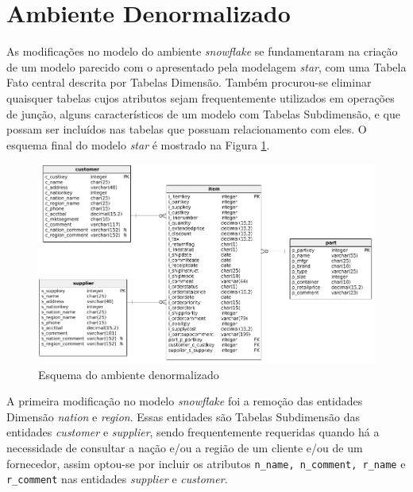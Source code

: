 \section{Ambiente Denormalizado}

As modificações no modelo do ambiente \textit{snowflake} se fundamentaram na criação de um modelo parecido com o apresentado pela modelagem \textit{star}, com uma Tabela Fato central descrita por Tabelas Dimensão. Também procurou-se eliminar quaisquer tabelas cujos atributos sejam frequentemente utilizados em operações de junção, alguns característicos de um modelo com Tabelas Subdimensão, e que possam ser incluídos nas tabelas que possuam relacionamento com eles. O esquema final do modelo \textit{star} é mostrado na Figura \ref{fig:star}.

\begin{figure}[h]
	\centering
		\includegraphics[width=\textwidth]{img/star.png}
	\caption{Esquema do ambiente denormalizado}
	\label{fig:star}
\end{figure}
 
A primeira modificação no modelo \textit{snowflake} foi a remoção das entidades Dimensão \textit{nation} e \textit{region}. Essas entidades são Tabelas Subdimensão das entidades \textit{customer} e \textit{supplier}, sendo frequentemente requeridas quando há a necessidade de consultar a nação e/ou a região de um cliente e/ou de um fornecedor, assim optou-se por incluir os atributos \texttt{n\_name, n\_comment, r\_name} e \texttt{r\_comment} nas entidades \textit{supplier} e \textit{customer}. 

